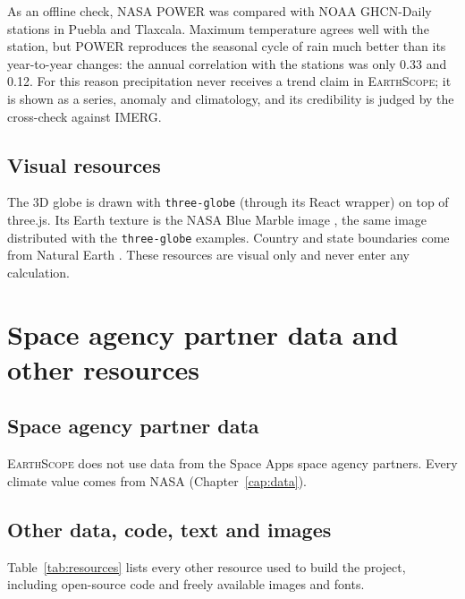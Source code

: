 \documentclass[12pt, oneside, openany]{report}
\newcommand{\EarthScope}{\textsc{EarthScope}}
\begin{document}
As an offline check, NASA POWER was compared with NOAA GHCN-Daily stations in Puebla and Tlaxcala. Maximum temperature agrees well with the station, but POWER reproduces the seasonal cycle of rain much better than its year-to-year changes: the annual correlation with the stations was only 0.33 and 0.12. For this reason precipitation never receives a trend claim in \EarthScope{}; it is shown as a series, anomaly and climatology, and its credibility is judged by the cross-check against IMERG.

\section{Visual resources}

The 3D globe is drawn with \texttt{three-globe} \cite{threeglobe} (through its React wrapper) on top of three.js. Its Earth texture is the NASA Blue Marble image \cite{bluemarble}, the same image distributed with the \texttt{three-globe} examples. Country and state boundaries come from Natural Earth \cite{naturalearth}. These resources are visual only and never enter any calculation.

\chapter{Space agency partner data and other resources}\label{cap:resources}

\section{Space agency partner data}

\EarthScope{} does not use data from the Space Apps space agency partners. Every climate value comes from NASA (Chapter~\ref{cap:data}).

\section{Other data, code, text and images}

Table~\ref{tab:resources} lists every other resource used to build the project, including open-source code and freely available images and fonts.
\end{document}
